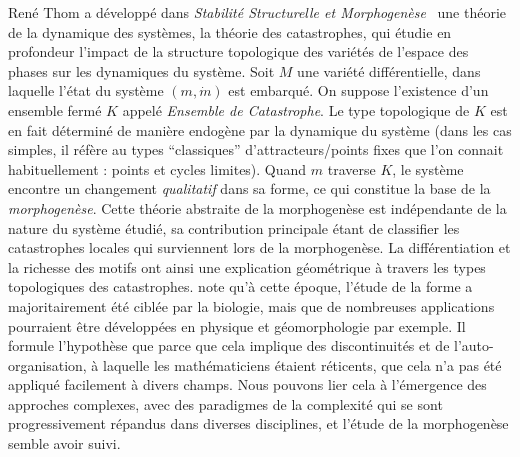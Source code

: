 {Ren{\'e} Thom a développé dans \emph{Stabilité Structurelle et Morphogenèse}~\cite{thom1974stabilite} une théorie de la dynamique des systèmes, la théorie des catastrophes, qui étudie en profondeur l'impact de la structure topologique des variétés de l'espace des phases sur les dynamiques du système. Soit $M$ une variété différentielle, dans laquelle l'état du système $(m,\dot{m})$ est embarqué. On suppose l'existence d'un ensemble fermé $K$ appelé \emph{Ensemble de Catastrophe}. Le type topologique de $K$ est en fait déterminé de manière endogène par la dynamique du système (dans les cas simples, il réfère au types ``classiques'' d'attracteurs/points fixes que l'on connait habituellement : points et cycles limites). Quand $m$ traverse $K$, le système encontre un changement \emph{qualitatif} dans sa forme, ce qui constitue la base de la \emph{morphogenèse}. Cette théorie abstraite de la morphogenèse est indépendante de la nature du système étudié, sa contribution principale étant de classifier les catastrophes locales qui surviennent lors de la morphogenèse. La différentiation et la richesse des motifs ont ainsi une explication géométrique à travers les types topologiques des catastrophes.  note qu'à cette époque, l'étude de la forme a majoritairement été ciblée par la biologie, mais que de nombreuses applications pourraient être développées en physique et géomorphologie par exemple. Il formule l'hypothèse que parce que cela implique des discontinuités et de l'auto-organisation, à laquelle les mathématiciens étaient réticents, que cela n'a pas été appliqué facilement à divers champs. Nous pouvons lier cela à l'émergence des approches complexes, avec des paradigmes de la complexité qui se sont progressivement répandus dans diverses disciplines, et l'étude de la morphogenèse semble avoir suivi. 
}




